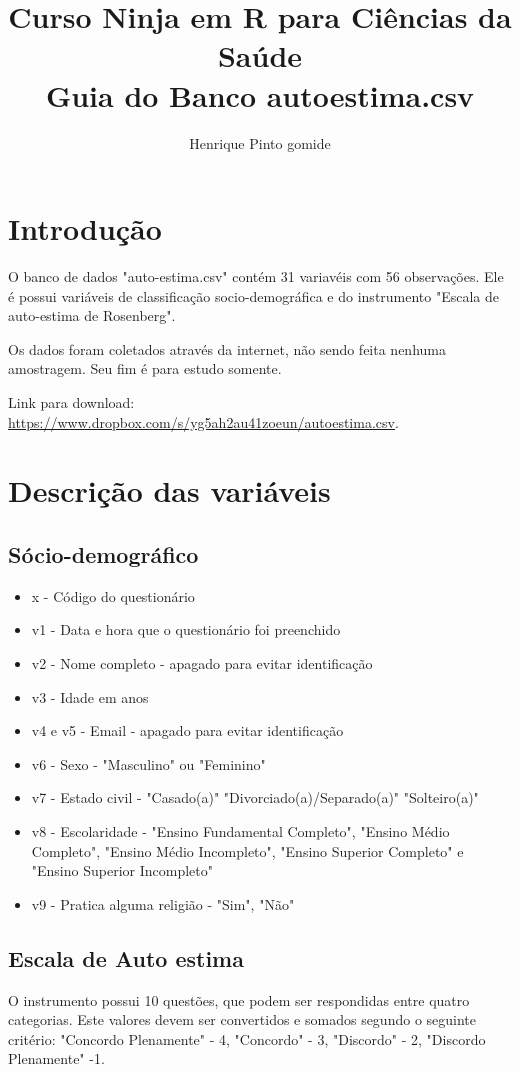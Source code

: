 \documentclass[12pt]{article}
\title{\textbf{Curso Ninja em R para Ciências da Saúde} \\ Guia do Banco autoestima.csv}
\author{Henrique Pinto gomide}
\date{}
\begin{document}
\maketitle

\section{Introdução}

O banco de dados "auto-estima.csv" contém 31 variavéis com 56 observações. Ele é possui variáveis de classificação socio-demográfica e do instrumento "Escala de auto-estima de Rosenberg".

Os dados foram coletados através da internet, não sendo feita nenhuma amostragem. Seu fim é para estudo somente.

Link para download: \url{https://www.dropbox.com/s/yg5ah2au41zoeun/autoestima.csv}.

\section{Descrição das variáveis}

\subsection{Sócio-demográfico}

\begin{itemize}
	\item x - Código do questionário
	\item v1 - Data e hora que o questionário foi preenchido
	\item v2 - Nome completo - apagado para evitar identificação
	\item v3 - Idade em anos
	\item v4 e v5 - Email - apagado para evitar identificação
	\item v6 - Sexo - "Masculino" ou "Feminino"
	\item v7 - Estado civil - "Casado(a)" "Divorciado(a)/Separado(a)" "Solteiro(a)"
	\item v8 - Escolaridade - "Ensino Fundamental Completo", "Ensino Médio Completo", "Ensino Médio Incompleto", "Ensino Superior Completo" e "Ensino Superior Incompleto"
	\item v9 - Pratica alguma religião - "Sim", "Não"
\end{itemize}

\subsection{Escala de Auto estima}
O instrumento possui 10 questões, que podem ser respondidas entre quatro categorias. Este valores devem ser convertidos e somados segundo o seguinte critério: "Concordo Plenamente" - 4, "Concordo" - 3, "Discordo" - 2, "Discordo Plenamente" -1.
\end{document}
